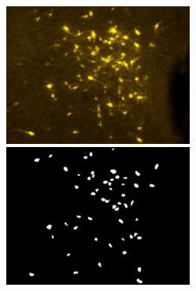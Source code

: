 \begin{figure}
{}
\centerline{
\includegraphics[width=0.55\textwidth]{figures/120_dataset/i_257.jpeg}
\includegraphics[width=0.55\textwidth]{figures/120_dataset/m_257.jpeg}
}
\label{fig:dataset}
\end{figure}%
